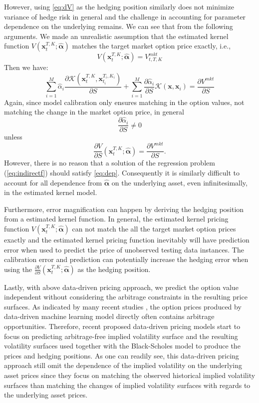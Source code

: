 \documentclass[letterpaper,12pt,titlepage,oneside,final]{book}
\numberwithin{equation}{section}
\theoremstyle{definition}
\newcommand{\vx}{\mathbf{x}}
\newcommand{\valpha}{\pmb{\widehat{\alpha}}}
\newcommand{\Vmkt}{V^{mkt}}
\begin{document}
However, using \eqref{eq:dV} as the hedging position similarly does not minimize variance of hedge risk in general and the challenge in accounting for parameter dependence on the underlying remains. We can see that from the  following arguments. We made an unrealistic assumption that the estimated kernel function $V(\mathbf{x}_{t}^{T,K};\valpha)$ matches the target market option price exactly, i.e.,
$$
V(\mathbf{x}_{t}^{T,K};\valpha) = \Vmkt_{t,T,K}
$$
Then we have:
$$
\sum_{i=1}^M \widehat{\alpha}_i \frac{\partial \mathcal{K}(\mathbf{x}_{t}^{T,K},\vx_{t_i}^{T_i,K_i})}{\partial S} + \sum_{i=1}^M \frac{\partial \widehat{\alpha}_i}{\partial S}\mathcal{K}(\vx,\vx_i)=\frac{\partial \Vmkt}{\partial S}
$$
Again, since model calibration  only ensures matching in the option values, not matching the change
in the market option price, in general
$$
\frac{\partial \widehat{\alpha}_i}{\partial S} \neq 0
$$
unless
\begin{equation}\label{eq:dep}
\frac{\partial V}{\partial S}(\vx_{t}^{T,K};\valpha) = \frac{\partial  \Vmkt}{\partial S}.
\end{equation}
However, there is no reason that a solution of the regression problem (\ref{eq:indirectf}) should satisfy \eqref{eq:dep}. Consequently it is similarly difficult to account for all dependence from $\valpha$ on the underlying asset, even infinitesimally, in the estimated kernel model.



Furthermore, error magnification can happen by deriving the hedging position from a estimated kernel function. In general, the estimated kernel pricing function $V(\mathbf{x}_{t}^{T,K};\valpha)$ can not match the all the target market option prices exactly and the  estimated kernel pricing function inevitably will have prediction error when used to predict the price of unobserved testing data instances. The calibration error and prediction can potentially increase the hedging error when using the $\frac{\partial V}{\partial S}(\vx_{t}^{T,K};\valpha)$ as the hedging position.

Lastly, with above data-driven pricing approach, we predict the option value independent without considering the arbitrage constraints in the resulting price surfaces. As indicated by many recent studies \cite{cao2021option,zheng2021incorporating,liu2019pricing}, the option prices produced by  data-driven machine learning model directly often contains arbitrage opportunities. Therefore, recent proposed data-driven pricing models \cite{cao2021option,zheng2021incorporating,liu2019pricing} start to focus on predicting arbitrage-free implied volatility surface and the resulting volatility surfaces used together with the Black-Scholes model to produce the prices and hedging positions. As one can readily see, this data-driven pricing approach still omit the dependence of the implied volatility on the underlying asset prices since they focus on matching the observed historical implied volatility surfaces than matching the changes of implied volatility surfaces with regards to the underlying asset prices.
\end{document}
